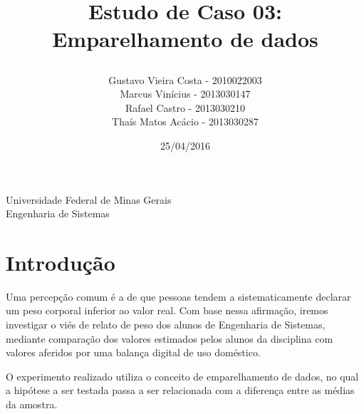 \documentclass[12pt, a4paper]{article}
\title{
	\begin{large}
		Estudo de Caso 03: Emparelhamento de dados
	\end{large}	}
\author{Gustavo Vieira Costa - 2010022003\\Marcus Vinícius - 2013030147\\Rafael Castro - 2013030210\\Thaís Matos Acácio - 2013030287}
\date{25/04/2016}
\begin{document}
	\maketitle
	
	\vspace*{-8.5cm}
	{\bf
		\begin{center}
			{\large
				\hspace*{0cm}Universidade Federal de Minas Gerais} \\
			\hspace*{0cm}Engenharia de Sistemas  \\
		\end{center}
	}
	\vspace*{5cm}
	
\section{Introdução}
Uma percepção comum é a de que pessoas tendem a sistematicamente declarar um peso corporal inferior ao valor real. Com base nessa afirmação, iremos investigar o viés de relato de peso dos alunos de Engenharia de Sistemas, mediante comparação dos valores estimados pelos alunos da disciplina com valores aferidos por uma balança digital de uso doméstico.
\par O experimento realizado utiliza o conceito de emparelhamento de dados, no qual a hipótese a ser testada passa a ser relacionada com a diferença entre as médias da amostra.
\end{document}
